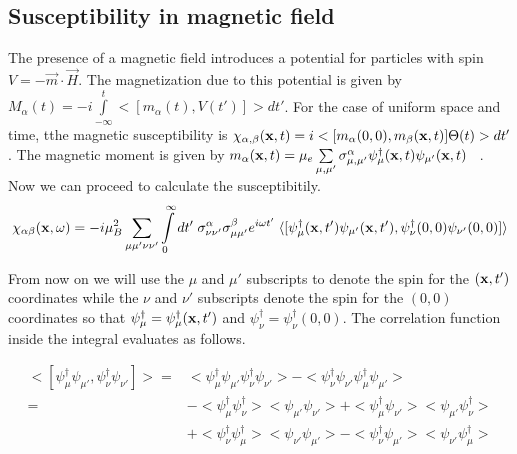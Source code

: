 \documentclass[prb,showpacs,amssymb,amsmath,twocolumn]{revtex4-1}
\begin{document}
\appendix
\begin{widetext}


\section{\label{sec:appA} Susceptibility in magnetic field} 

The presence of a magnetic field introduces a potential for particles with spin $V=-\vec{m}\cdot\vec{H}$. The magnetization due to this potential is given by $M_\alpha(t)=-i\int\limits_{-\infty}^t <[m_\alpha(t),V(t')]>dt'$. For the case of uniform space and time, tthe magnetic susceptibility is $\chi_{\alpha,\beta}({\bf x},t)=i<[m_\alpha(0,0),m_\beta({\bf x},t)]\Theta(t)>dt'$. The magnetic moment is given by $m_\alpha({\bf x},t)=\mu_e\sum\limits_{\mu,\mu'} \sigma^{\alpha}_{\mu,\mu'}\psi^\dagger_\mu({\bf x},t) \psi_{\mu'}({\bf x},t)$ ~\cite{mahan}. Now we can proceed to calculate the susceptibitily.
\begin{align*}
\chi_{\alpha\beta}({\bf x}, \omega)=-i \mu_B^2\sum\limits_{\mu\mu'\nu\nu'}\int\limits_0^{\infty}dt' \; \sigma^\alpha_{\nu\nu'}\sigma^\beta_{\mu\mu'}e^{i\omega t'} \; 
\langle [\psi^\dagger_\mu({\bf x} ,t') \psi_{\mu'}({\bf x},t'),  \psi^\dagger_\nu(0,0) \psi_{\nu'}(0,0) ]\rangle
\end{align*}

From now on we will use the $\mu$ and $\mu'$ subscripts to denote the spin for the $({\bf x},t')$ coordinates while the $\nu$ and $\nu'$ subscripts denote the spin for the $(0,0)$ coordinates so that $\psi^\dagger_{\mu}=\psi^\dagger_{\mu}({\bf x},t')$ and $\psi^\dagger_{\nu}=\psi^\dagger_{\nu}(0,0)$. The correlation function inside the integral evaluates as follows.

\begin{align*}
<[\psi^\dagger_{\mu} \psi_{\mu'},\psi^\dagger_{\nu} \psi_{\nu'}]>=&<\psi^\dagger_{\mu} \psi_{\mu'}\psi^\dagger_{\nu} \psi_{\nu'}>-<\psi^\dagger_{\nu} \psi_{\nu'}\psi^\dagger_{\mu} \psi_{\mu'}> \\
=&-<\psi^\dagger_{\mu}\psi^\dagger_{\nu}><\psi_{\mu'}\psi_{\nu'}>+<\psi^\dagger_{\mu}\psi_{\nu'}><\psi_{\mu'}\psi^\dagger_{\nu}> \\ 
&+<\psi^\dagger_{\nu}\psi^\dagger_{\mu}><\psi_{\nu'}\psi_{\mu'}>-<\psi^\dagger_{\nu}\psi_{\mu'}><\psi_{\nu'}\psi^\dagger_{\mu}> \\
\end{align*}


\end{widetext}
\end{document}
